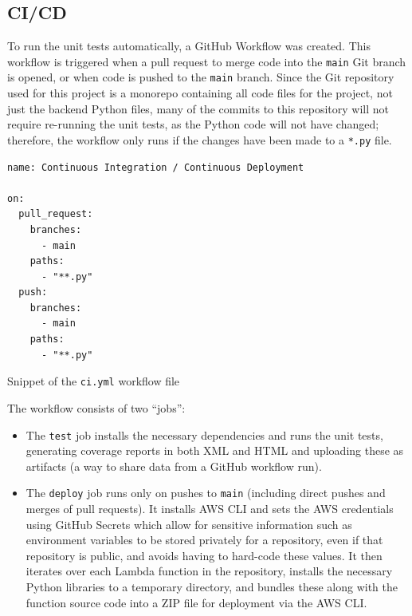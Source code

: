 \documentclass[a4paper,11pt]{report}
\newenvironment{code}{\captionsetup{type=listing}}{}
\begin{document}
\subsection{CI/CD}
To run the unit tests automatically, a GitHub Workflow\supercite{workflow} was created.
This workflow is triggered when a pull request to merge code into the \verb|main| Git branch is opened, or when code is pushed to the \verb|main| branch.
Since the Git repository used for this project is a monorepo containing all code files for the project, not just the backend Python files, many of the commits to this repository will not require re-running the unit tests, as the Python code will not have changed;
therefore, the workflow only runs if the changes have been made to a \verb|*.py| file.

\begin{code}
\begin{verbatim}
name: Continuous Integration / Continuous Deployment

on:
  pull_request:
    branches:
      - main
    paths:
      - "**.py"
  push:
    branches:
      - main
    paths:
      - "**.py"
\end{verbatim}
\caption{Snippet of the \texttt{ci.yml} workflow file}
\end{code}

The workflow consists of two ``jobs'':
\begin{itemize}
    \item   The \verb|test| job installs the necessary dependencies and runs the unit tests, generating coverage reports in both XML and HTML and uploading these as artifacts\supercite{artifacts} (a way to share data from a GitHub workflow run).
    \item   The \verb|deploy| job runs only on pushes to \verb|main| (including direct pushes and merges of pull requests).
            It installs AWS CLI\supercite{aws_cli} and sets the AWS credentials using GitHub Secrets\supercite{githubsecrets} which allow for sensitive information such as environment variables to be stored privately for a repository, even if that repository is public, and avoids having to hard-code these values.
            It then iterates over each Lambda function in the repository, installs the necessary Python libraries to a temporary directory, and bundles these along with the function source code into a ZIP file for deployment via the AWS CLI. 
\end{itemize}
\end{document}
